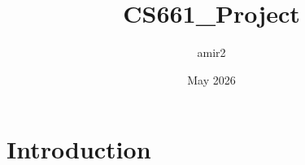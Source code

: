 \documentclass{article}
\title{CS661_Project}
\author{amir2 }
\date{May 2026}
\begin{document}
\maketitle

\section{Introduction}
\end{document}
